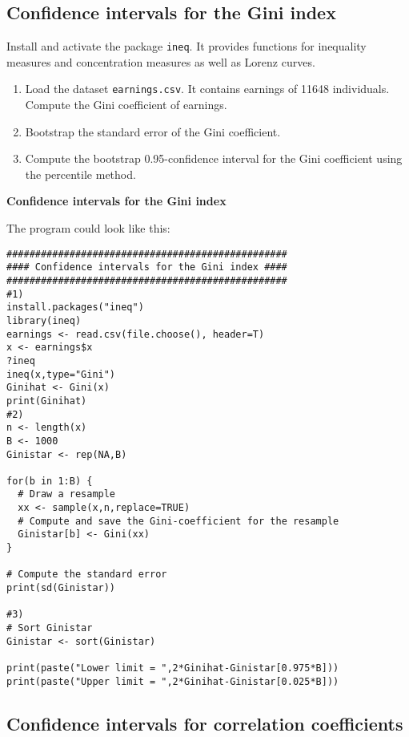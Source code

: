 \documentclass{article}
\begin{document}
\subsection{Confidence intervals for the Gini index}

Install and activate the package \texttt{ineq}. It provides functions for
inequality measures and concentration measures as well as Lorenz curves.

\begin{enumerate}
\item Load the dataset \texttt{earnings.csv}. It contains earnings of 11648
individuals. Compute the Gini coefficient of earnings.

\item Bootstrap the standard error of the Gini coefficient.

\item Compute the bootstrap 0.95-confidence interval for the Gini
coefficient using the percentile method.
\end{enumerate}

\begin{solution}
\textbf{Confidence intervals for the Gini index}

The program could look like this:
\begin{verbatim}
#################################################
#### Confidence intervals for the Gini index ####
#################################################
#1)
install.packages("ineq")
library(ineq)
earnings <- read.csv(file.choose(), header=T)
x <- earnings$x
?ineq
ineq(x,type="Gini")
Ginihat <- Gini(x)
print(Ginihat)
#2)
n <- length(x)
B <- 1000
Ginistar <- rep(NA,B)

for(b in 1:B) {
  # Draw a resample
  xx <- sample(x,n,replace=TRUE)
  # Compute and save the Gini-coefficient for the resample
  Ginistar[b] <- Gini(xx)
}

# Compute the standard error
print(sd(Ginistar))

#3)
# Sort Ginistar
Ginistar <- sort(Ginistar)

print(paste("Lower limit = ",2*Ginihat-Ginistar[0.975*B]))
print(paste("Upper limit = ",2*Ginihat-Ginistar[0.025*B]))
\end{verbatim}
\end{solution}

\subsection{Confidence intervals for correlation coefficients}
\end{document}
